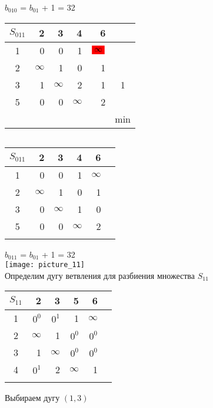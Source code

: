 \documentclass[12pt]{article}
\begin{document}
$b_{010}$ = $b_{01}$ + 1 = 32\\

\begin{flushleft}
\begin{tabular}{c||rrrr||c}
$S_{011}$  &2 & 3 & 4 & 6 & \\
\hline
\hline
1 &  0 & 0 & 1  & $\colorbox{red}{$\infty$}$ & \\
2 &  $\infty$ & 1 & 0  & 1 & \\
3 &  1 & $\infty$ & 2  & 1 & 1\\
5 &  0 & 0 & $\infty$  & 2 \\
\hline
\hline
 &  &  &  &  & min \\
\end{tabular}
$\qquad $ 
\begin{tabular}{c||rrrr||c}
$S_{011}$  &2 & 3 & 4 & 6 & \\
\hline
\hline
1 &  0 & 0 & 1  & $\infty$ & \\
2 &  $\infty$ & 1 & 0  & 1 & \\
3 &  0 & $\infty$ & 1  & 0 & \\
5 &  0 & 0 & $\infty$  & 2 \\
\hline
\hline
 &  &  &  & & \\
\end{tabular}
\end{flushleft}

$b_{011}$ = $b_{01}$ + 1 = 32\\

\texttt{[image: picture\_11]}\\

Определим дугу ветвления для разбиения множества $S_{11}$\\

\begin{flushleft}
\begin{tabular}{c||rrrr||c}
$S_{11}$ & 2 & 3 & 5 & 6 & \\
\hline
\hline
1 &  $0^0$ & $0^1$  & 1 & $\infty$ & \\
2 &  $\infty$ & 1  & $0^0$ & $0^0$ & \\
3 &  1 & $\infty$  & $0^0$ & $0^0$ & \\
4 &  $0^1$ & 2  & $\infty$ & 1 & \\
\hline
\hline
 &  &  &  & & \\
\end{tabular}
\end{flushleft}

Выбираем дугу $(1,3)$
\end{document}
